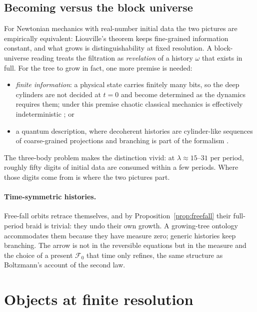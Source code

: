 \documentclass[11pt]{article}
\theoremstyle{remark}
\newcommand{\F}{\mathcal{F}}
\begin{document}
\subsection{Becoming versus the block universe}

For Newtonian mechanics with real-number initial data the two pictures are empirically equivalent: Liouville's
theorem keeps fine-grained information constant, and what grows is distinguishability at fixed resolution. A
block-universe reading treats the filtration as \emph{revelation} of a history $\omega$ that exists in full.
For the tree to grow in fact, one more premise is needed:
\begin{itemize}[leftmargin=*]
\item \emph{finite information}: a physical state carries finitely many bits, so the deep cylinders are not
      decided at $t=0$ and become determined as the dynamics requires them; under this premise chaotic
      classical mechanics is effectively indeterministic \cite{DelSantoGisin2019}; or
\item a quantum description, where decoherent histories are cylinder-like sequences of coarse-grained
      projections and branching is part of the formalism \cite{GellMannHartle1990}.
\end{itemize}
The three-body problem makes the distinction vivid: at $\lambda\approx15$--$31$ per period, roughly fifty
digits of initial data are consumed within a few periods. Where those digits come from is where the two
pictures part.

\paragraph{Time-symmetric histories.} Free-fall orbits retrace themselves, and by
Proposition~\ref{prop:freefall} their full-period braid is trivial: they undo their own growth. A
growing-tree ontology accommodates them because they have measure zero; generic histories keep branching. The
arrow is not in the reversible equations but in the measure and the choice of a present $\F_0$ that time only
refines, the same structure as Boltzmann's account of the second law.

\section{Objects at finite resolution}
\label{sec:objects}
\end{document}
